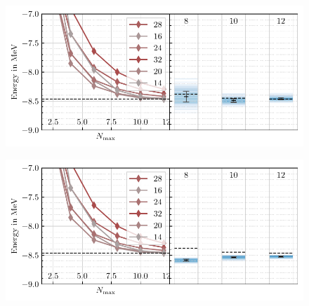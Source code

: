 \begin{figure}[H]
  \includegraphics{media/outlook_frequency_lower.pdf}
\end{figure}
\begin{figure}[H]
  \includegraphics{media/outlook_frequency_higher.pdf}
\end{figure}
